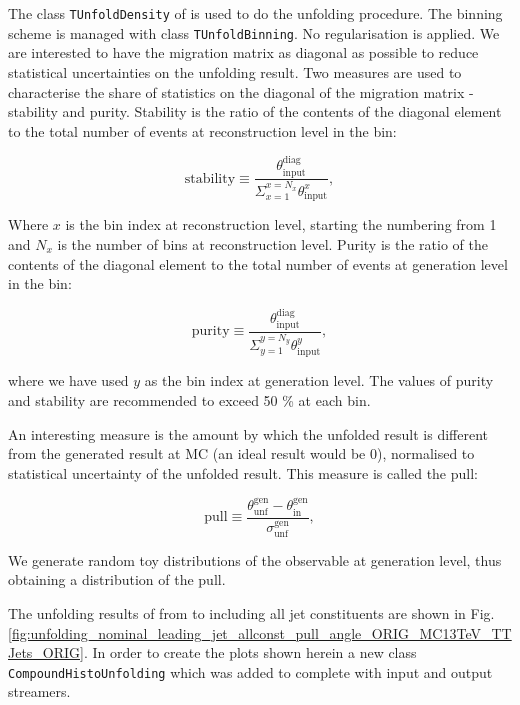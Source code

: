 The class \lstinline[language=sh]|TUnfoldDensity|\cite{Schmitt:2012kp} of \ROOT is used to do the unfolding procedure. The binning scheme is managed with class \lstinline[language=sh]|TUnfoldBinning|. No regularisation is applied. We are interested to have the migration matrix as diagonal as possible to reduce statistical uncertainties on the unfolding result. Two measures are used to characterise the share of statistics on the diagonal of the migration matrix - stability and purity. Stability is the ratio of the contents of the diagonal element to the total number of events at reconstruction level in the bin:

\begin{equation}
  \text{stability}\equiv\frac{\theta^{\text{diag}}_{\text{input}}}{\Sigma_{x=1}^{x=N_{x}}\theta^{x}_{\text{input}}},
\end{equation}

Where $x$ is the bin index at reconstruction level, starting the numbering from 1 and $N_{x}$ is the number of bins at reconstruction level. Purity is the ratio of the contents of the diagonal element to the total number of events at generation level in the bin:

\begin{equation}
  \text{purity}\equiv\frac{\theta^{\text{diag}}_{\text{input}}}{\Sigma_{y=1}^{y=N_{y}}\theta^{y}_{\text{input}}},
\end{equation}

where we have used $y$ as the bin index at generation level. The values of purity and stability are recommended to exceed 50 \% at each bin.

An interesting measure is the amount by which the unfolded result is different from the generated result at MC (an ideal result would be 0), normalised to statistical uncertainty of the unfolded result. This measure is called the pull:

\begin{equation}
  \text{pull}\equiv\frac{\theta^{\text{gen}}_{\text{unf}}-\theta^{\text{gen}}_{\text{in}}}{\sigma^{\text{gen}}_{\text{unf}}},
\end{equation}

We generate random toy distributions of the observable at generation level, thus obtaining a distribution of the pull.

The unfolding results of \pullangle from \leadingjet to \scndleadingjet including all jet constituents are shown in Fig. \ref{fig:unfolding_nominal_leading_jet_allconst_pull_angle_ORIG_MC13TeV_TTJets_ORIG}. In order to create the plots shown herein a new class \lstinline[language=sh]|CompoundHistoUnfolding| \cite{url:compoundhistounfolding} which was added to \ROOT complete with input and output streamers.

